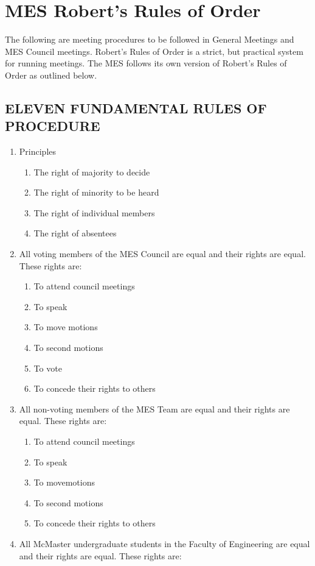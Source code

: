 \section{MES Robert's Rules of Order}
\label{mes-roberts-rules-of-order}
The following are meeting procedures to be followed in General Meetings
and MES Council meetings. Robert's Rules of Order is a strict, but
practical system for running meetings. The MES follows its own version
of Robert's Rules of Order as outlined below.

\subsection{ELEVEN FUNDAMENTAL RULES OF PROCEDURE}
\label{eleven-fundamental-rules-of-procedure}

\begin{enumerate}
 \item
  Principles

  \begin{enumerate}
   \item
    The right of majority to decide
   \item
    The right of minority to be heard
   \item
    The right of individual members
   \item
    The right of absentees
  \end{enumerate}
 \item
  All voting members of the MES Council are equal and their rights are equal. These rights are:

  \begin{enumerate}
   \item
    To attend council meetings
   \item
    To speak
   \item
    To move motions
   \item
    To second motions
   \item
    To vote
   \item
    To concede their rights to others
  \end{enumerate}
 \item
  All non-voting members of the MES Team are equal and their rights are equal. These rights are:

  \begin{enumerate}
   \item
    To attend council meetings
   \item
    To speak
   \item
    To movemotions %
   \item
    To second motions
   \item
    To concede their rights to others
  \end{enumerate}
 \item
  All McMaster undergraduate students in the Faculty of Engineering are equal and their rights are equal. These rights are:


\end{enumerate}
